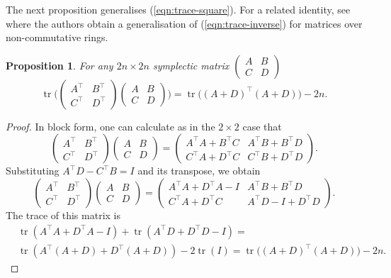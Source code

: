\documentclass[11pt]{amsart}
\newtheorem{proposition}[theorem]{Proposition}
\theoremstyle{definition}
\numberwithin{figure}{section}
\numberwithin{equation}{section}
\numberwithin{table}{section}
\newcommand{\tr}{\operatorname{tr}}
\begin{document}
The next proposition generalises (\ref{eqn:trace-square}).
For a related identity, see \cite[Corollary 4.2]{GKW} where the authors obtain a generalisation of (\ref{eqn:trace-inverse}) for matrices over non-commutative rings.
\begin{proposition} \label{prop:symplectic}
For any $2n \times 2n$ symplectic matrix $\begin{pmatrix} A & B \\ C & D \end{pmatrix}$
\begin{equation} \label{eqn:symplectic}
\tr \Big( \begin{pmatrix} A^{\top} & B^{\top} \\ C^{\top} & D^{\top} \end{pmatrix}\begin{pmatrix} A & B \\ C & D \end{pmatrix} \Big) = \tr\big( (A+D)^{\top} (A+D) \big) - 2n
.
\end{equation}
\end{proposition}
\begin{proof}
In block form, one can calculate as in the $2 \times 2$ case that
\[
\begin{pmatrix} A^{\top} & B^{\top} \\ C^{\top} & D^{\top} \end{pmatrix}\begin{pmatrix} A & B \\ C & D \end{pmatrix}
=
\begin{pmatrix}
A^\top A+B^\top C & A^\top B + B^\top D \\ C^\top A+ D^\top C& C^\top B + D^\top D
\end{pmatrix}
.
\]
Substituting $A^{\top}D - C^{\top}B = I$ and its transpose, we obtain
\[
\begin{pmatrix} A^{\top} & B^{\top} \\ C^{\top} & D^{\top} \end{pmatrix}\begin{pmatrix} A & B \\ C & D \end{pmatrix}
=
\begin{pmatrix}
A^\top A+D^\top A-I & A^\top B + B^\top D \\ C^\top A+ D^\top C& A^\top D-I + D^\top D
\end{pmatrix}
.
\]
The trace of this matrix is
\begin{align*}
&\tr(A^\top A + D^\top A-I) + \tr(A^\top D + D^\top D - I) = \\
&\tr(A^\top (A+D) + D^\top (A+D)) - 2\tr(I) = \tr\big( (A+D)^\top (A+D) \big) - 2n.
\end{align*}
\end{proof}
\end{document}
